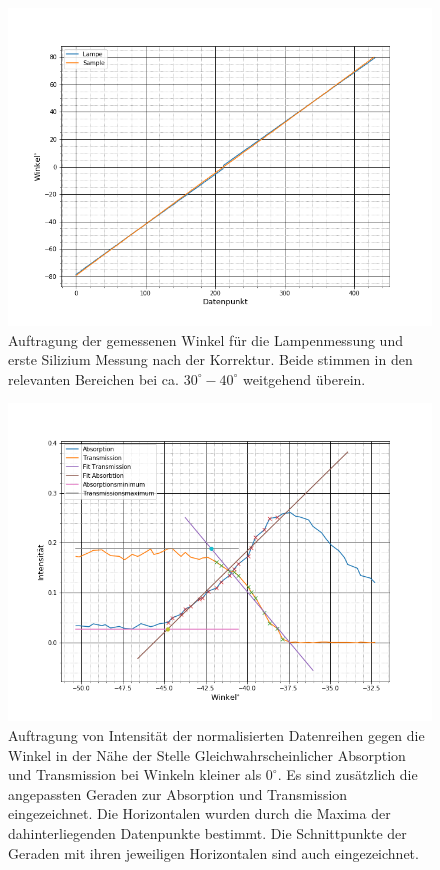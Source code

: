 \begin{figure}
	\includegraphics[scale=0.5]{Bilder/anhang/korrektur_channels_2}
	\centering
	\caption[Korrigierter Lampendatensatz 2. Silizium messung]{\small Auftragung der gemessenen Winkel für die Lampenmessung und erste Silizium Messung nach der Korrektur. Beide stimmen in den relevanten Bereichen bei ca. $30^{\circ}-40^{\circ}$ weitgehend überein.}
\end{figure}
\begin{figure}
	\includegraphics[scale=0.5]{Bilder/anhang/si_2_l}
	\centering
	\caption[Geraden Anpassungen 2. Silizium Messung links]{\small Auftragung von Intensität der normalisierten Datenreihen gegen die  Winkel in der Nähe der Stelle Gleichwahrscheinlicher Absorption und Transmission bei Winkeln kleiner als $0^\circ$. Es sind zusätzlich die angepassten Geraden zur Absorption und Transmission eingezeichnet. Die Horizontalen wurden durch die Maxima der dahinterliegenden Datenpunkte bestimmt. Die Schnittpunkte der Geraden mit ihren jeweiligen Horizontalen sind auch eingezeichnet.}
\end{figure}
